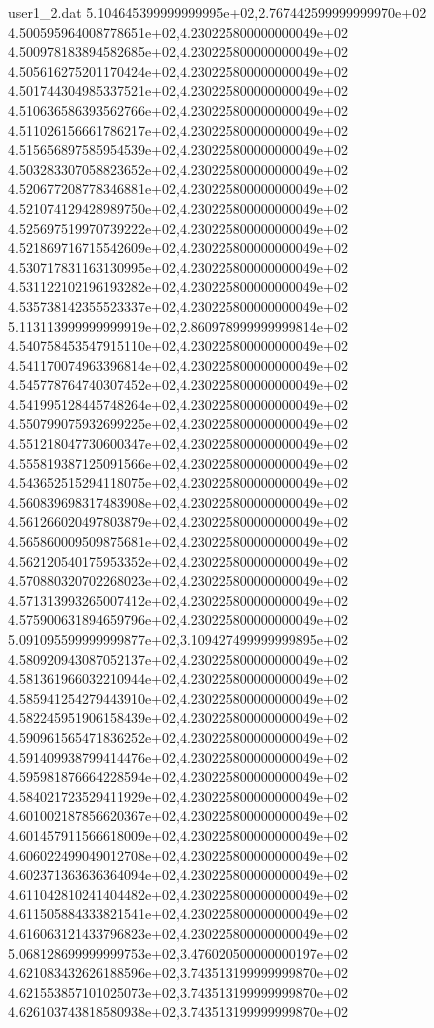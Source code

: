 \begin{filecontents}{user1_2.dat}
5.104645399999999995e+02,2.767442599999999970e+02
4.500595964008778651e+02,4.230225800000000049e+02
4.500978183894582685e+02,4.230225800000000049e+02
4.505616275201170424e+02,4.230225800000000049e+02
4.501744304985337521e+02,4.230225800000000049e+02
4.510636586393562766e+02,4.230225800000000049e+02
4.511026156661786217e+02,4.230225800000000049e+02
4.515656897585954539e+02,4.230225800000000049e+02
4.503283307058823652e+02,4.230225800000000049e+02
4.520677208778346881e+02,4.230225800000000049e+02
4.521074129428989750e+02,4.230225800000000049e+02
4.525697519970739222e+02,4.230225800000000049e+02
4.521869716715542609e+02,4.230225800000000049e+02
4.530717831163130995e+02,4.230225800000000049e+02
4.531122102196193282e+02,4.230225800000000049e+02
4.535738142355523337e+02,4.230225800000000049e+02
5.113113999999999919e+02,2.860978999999999814e+02
4.540758453547915110e+02,4.230225800000000049e+02
4.541170074963396814e+02,4.230225800000000049e+02
4.545778764740307452e+02,4.230225800000000049e+02
4.541995128445748264e+02,4.230225800000000049e+02
4.550799075932699225e+02,4.230225800000000049e+02
4.551218047730600347e+02,4.230225800000000049e+02
4.555819387125091566e+02,4.230225800000000049e+02
4.543652515294118075e+02,4.230225800000000049e+02
4.560839698317483908e+02,4.230225800000000049e+02
4.561266020497803879e+02,4.230225800000000049e+02
4.565860009509875681e+02,4.230225800000000049e+02
4.562120540175953352e+02,4.230225800000000049e+02
4.570880320702268023e+02,4.230225800000000049e+02
4.571313993265007412e+02,4.230225800000000049e+02
4.575900631894659796e+02,4.230225800000000049e+02
5.091095599999999877e+02,3.109427499999999895e+02
4.580920943087052137e+02,4.230225800000000049e+02
4.581361966032210944e+02,4.230225800000000049e+02
4.585941254279443910e+02,4.230225800000000049e+02
4.582245951906158439e+02,4.230225800000000049e+02
4.590961565471836252e+02,4.230225800000000049e+02
4.591409938799414476e+02,4.230225800000000049e+02
4.595981876664228594e+02,4.230225800000000049e+02
4.584021723529411929e+02,4.230225800000000049e+02
4.601002187856620367e+02,4.230225800000000049e+02
4.601457911566618009e+02,4.230225800000000049e+02
4.606022499049012708e+02,4.230225800000000049e+02
4.602371363636364094e+02,4.230225800000000049e+02
4.611042810241404482e+02,4.230225800000000049e+02
4.611505884333821541e+02,4.230225800000000049e+02
4.616063121433796823e+02,4.230225800000000049e+02
5.068128699999999753e+02,3.476020500000000197e+02
4.621083432626188596e+02,3.743513199999999870e+02
4.621553857101025073e+02,3.743513199999999870e+02
4.626103743818580938e+02,3.743513199999999870e+02

\end{filecontents}
